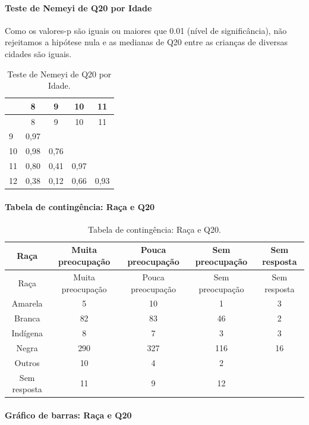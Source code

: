 \documentclass[]{article}
\let\oldparagraph\paragraph
\renewcommand{\paragraph}[1]{\oldparagraph{#1}\mbox{}}
\begin{document}
\hypertarget{teste-de-nemeyi-de-q20-por-idade}{%
\paragraph{Teste de Nemeyi de Q20 por Idade}\label{teste-de-nemeyi-de-q20-por-idade}}

Como os valores-p são iguais ou maiores que 0.01 (nível de significância), não rejeitamos a hipótese nula e as medianas de Q20 entre as crianças de diversas cidades são iguais.

\begin{longtable}[]{@{}lcccc@{}}
\caption{\label{tab:unnamed-chunk-395}Teste de Nemeyi de Q20 por Idade.}\tabularnewline
\toprule
& 8 & 9 & 10 & 11\tabularnewline
\midrule
\endfirsthead
\toprule
& 8 & 9 & 10 & 11\tabularnewline
\midrule
\endhead
9 & 0,97 & & &\tabularnewline
10 & 0,98 & 0,76 & &\tabularnewline
11 & 0,80 & 0,41 & 0,97 &\tabularnewline
12 & 0,38 & 0,12 & 0,66 & 0,93\tabularnewline
\bottomrule
\end{longtable}

\cleardoublepage

\hypertarget{tabela-de-continguxeancia-rauxe7a-e-q20}{%
\paragraph{Tabela de contingência: Raça e Q20}\label{tabela-de-continguxeancia-rauxe7a-e-q20}}

\begin{longtable}[]{@{}ccccc@{}}
\caption{\label{tab:unnamed-chunk-396}Tabela de contingência: Raça e Q20.}\tabularnewline
\toprule
Raça & Muita preocupação & Pouca preocupação & Sem preocupação & Sem resposta\tabularnewline
\midrule
\endfirsthead
\toprule
Raça & Muita preocupação & Pouca preocupação & Sem preocupação & Sem resposta\tabularnewline
\midrule
\endhead
Amarela & 5 & 10 & 1 & 3\tabularnewline
Branca & 82 & 83 & 46 & 2\tabularnewline
Indígena & 8 & 7 & 3 & 3\tabularnewline
Negra & 290 & 327 & 116 & 16\tabularnewline
Outros & 10 & 4 & 2 &\tabularnewline
Sem resposta & 11 & 9 & 12 &\tabularnewline
\bottomrule
\end{longtable}

\hypertarget{gruxe1fico-de-barras-rauxe7a-e-q20}{%
\paragraph{Gráfico de barras: Raça e Q20}\label{gruxe1fico-de-barras-rauxe7a-e-q20}}
\end{document}
